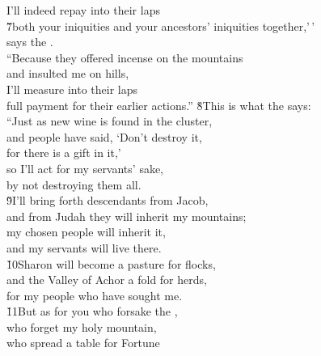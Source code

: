 \begin{poetry}
\poemlll       I'll indeed repay into their laps \\
\poeml \v{7}both your iniquities and your ancestors' iniquities together,'\,' \\
\poemll    says the . \\
\poeml ``Because they offered incense on the mountains \\
\poemll    and insulted me on hills, \\
\poeml I'll measure into their laps \\
\poemll    full payment for their earlier actions.''
\poeml \v{8}This is what the  says: \\
\poemll    ``Just as new wine is found in the cluster, \\
\poeml and people have said, `Don't destroy it, \\
\poemll    for there is a gift in it,' \\
\poeml so I'll act for my servants' sake, \\
\poemll    by not destroying them all. \\
\poeml \v{9}I'll bring forth descendants from Jacob, \\
\poemll    and from Judah they will inherit my mountains; \\
\poeml my chosen people will inherit it, \\
\poemll    and my servants will live there. \\
\poeml \v{10}Sharon will become a pasture for flocks, \\
\poemll    and the Valley of Achor a fold for herds, \\
\poemlll       for my people who have sought me. \\
\poeml \v{11}But as for you who forsake the , \\
\poemll    who forget my holy mountain, \\
\poeml who spread a table for Fortune \\

\end{poetry}
